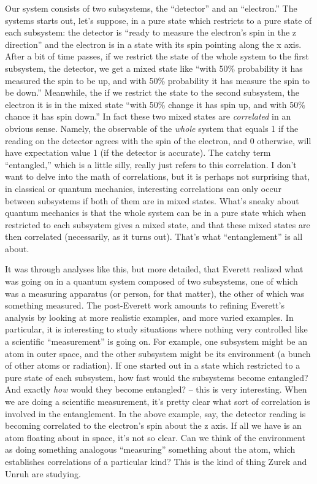 \documentclass[12pt]{article}
\begin{document}
Our system consists of two subsystems, the ``detector'' and an
``electron.'' The systems starts out, let's suppose, in a pure state
which restricts to a pure state of each subsystem: the detector is
``ready to measure the electron's spin in the z direction'' and the
electron is in a state with its spin pointing along the x axis. After a
bit of time passes, if we restrict the state of the whole system to the
first subsystem, the detector, we get a mixed state like ``with 50\%
probability it has measured the spin to be up, and with 50\% probability
it has measure the spin to be down.'' Meanwhile, the if we restrict the
state to the second subsystem, the electron it is in the mixed state
``with 50\% change it has spin up, and with 50\% chance it has spin
down.'' In fact these two mixed states are \emph{correlated} in an
obvious sense. Namely, the observable of the \emph{whole} system that
equals 1 if the reading on the detector agrees with the spin of the
electron, and 0 otherwise, will have expectation value 1 (if the
detector is accurate). The catchy term ``entangled,'' which is a little
silly, really just refers to this correlation. I don't want to delve
into the math of correlations, but it is perhaps not surprising that, in
classical or quantum mechanics, interesting correlations can only occur
between subsystems if both of them are in mixed states. What's sneaky
about quantum mechanics is that the whole system can be in a pure state
which when restricted to each subsystem gives a mixed state, and that
these mixed states are then correlated (necessarily, as it turns out).
That's what ``entanglement'' is all about.

It was through analyses like this, but more detailed, that Everett
realized what was going on in a quantum system composed of two
subsystems, one of which was a measuring apparatus (or person, for that
matter), the other of which was something measured. The post-Everett
work amounts to refining Everett's analysis by looking at more realistic
examples, and more varied examples. In particular, it is interesting to
study situations where nothing very controlled like a scientific
``measurement'' is going on. For example, one subsystem might be an atom
in outer space, and the other subsystem might be its environment (a
bunch of other atoms or radiation). If one started out in a state which
restricted to a pure state of each subsystem, how fast would the
subsystems become entangled? And exactly \emph{how} would they become
entangled? -- this is very interesting. When we are doing a scientific
measurement, it's pretty clear what sort of correlation is involved in
the entanglement. In the above example, say, the detector reading is
becoming correlated to the electron's spin about the z axis. If all we
have is an atom floating about in space, it's not so clear. Can we think
of the environment as doing something analogous ``measuring'' something
about the atom, which establishes correlations of a particular kind?
This is the kind of thing Zurek and Unruh are studying.
\end{document}
